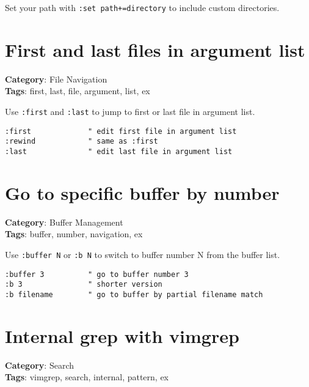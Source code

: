 {{{{{{Set your path with {\footnotesize \Verb§:set path+=directory§} to include custom directories.

\section{First and last files in argument list}

\textbf{Category}: File Navigation\\ \textbf{Tags}: first, last, file, argument, list, ex
\vspace{0.5cm}

Use {\footnotesize \Verb§:first§} and {\footnotesize \Verb§:last§} to jump to first or last file in argument list.

\begin{Exa*}{}
\begin{Verbatim}[fontsize=\footnotesize, breaklines, breakanywhere]
:first             " edit first file in argument list
:rewind            " same as :first
:last              " edit last file in argument list
\end{Verbatim}
\end{Exa*}

\section{Go to specific buffer by number}

\textbf{Category}: Buffer Management\\ \textbf{Tags}: buffer, number, navigation, ex
\vspace{0.5cm}

Use {\footnotesize \Verb§:buffer N§} or {\footnotesize \Verb§:b N§} to switch to buffer number N from the buffer list.

\begin{Exa*}{}
\begin{Verbatim}[fontsize=\footnotesize, breaklines, breakanywhere]
:buffer 3          " go to buffer number 3
:b 3               " shorter version
:b filename        " go to buffer by partial filename match
\end{Verbatim}
\end{Exa*}

\section{Internal grep with vimgrep}

\textbf{Category}: Search\\ \textbf{Tags}: vimgrep, search, internal, pattern, ex
\vspace{0.5cm}

}}}}}}
